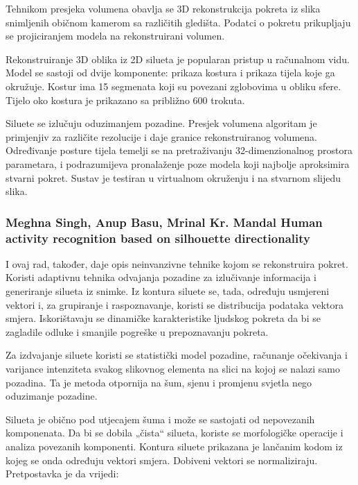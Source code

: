 \documentclass[times, utf8, diplomski]{fer}
\begin{document}
Tehnikom presjeka volumena obavlja se 3D rekonstrukcija pokreta iz slika snimljenih
običnom kamerom sa različitih gledišta. Podatci o pokretu prikupljaju se projiciranjem modela
na rekonstruirani volumen.

Rekonstruiranje 3D oblika iz 2D silueta je popularan pristup u računalnom vidu. Model se
sastoji od dvije komponente: prikaza kostura i prikaza tijela koje ga okružuje. Kostur ima 15
segmenata koji su povezani zglobovima u obliku sfere. Tijelo oko kostura je prikazano sa približno
600 trokuta.

Siluete se izlučuju oduzimanjem pozadine. Presjek volumena algoritam je primjenjiv za
različite rezolucije i daje granice rekonstruiranog volumena.
Određivanje posture tijela temelji se na pretraživanju 32-dimenzionalnog prostora parametara,
i podrazumijeva pronalaženje poze modela koji najbolje aproksimira stvarni pokret.
Sustav je testiran u virtualnom okruženju i na stvarnom slijedu slika.

\subsubsection{ 
Meghna Singh, Anup Basu, Mrinal Kr. Mandal
Human activity recognition based on silhouette directionality
 }
 
I ovaj rad, također, daje opis neinvanzivne tehnike kojom se rekonstruira pokret. Koristi
adaptivnu tehnika odvajanja pozadine za izlučivanje informacija i generiranje silueta iz
snimke. Iz kontura siluete se, tada, određuju usmjereni vektori i, za grupiranje i
raspoznavanje, koristi se distribucija podataka vektora smjera. Iskorištavaju se dinamičke
karakteristike ljudskog pokreta da bi se zagladile odluke i smanjile pogreške u prepoznavanju
pokreta.

Za izdvajanje siluete koristi se statistički model pozadine, računanje očekivanja i varijance
intenziteta svakog slikovnog elementa na slici na kojoj se nalazi samo pozadina. Ta je metoda
otpornija na šum, sjenu i promjenu svjetla nego oduzimanje pozadine.

Silueta je obično pod utjecajem šuma i može se sastojati od nepovezanih komponenata. Da bi
se dobila „čista“ silueta, koriste se morfologičke operacije i analiza povezanih komponenti.
Kontura siluete prikazana je lančanim kodom iz kojeg se onda određuju vektori smjera.
Dobiveni vektori se normaliziraju. \\


Pretpostavka je da vrijedi: 
\end{document}
